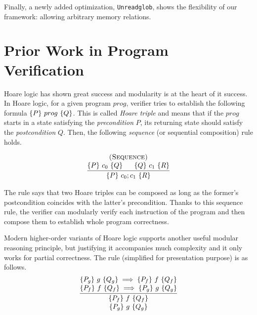 Finally, a newly added optimization, \texttt{Unreadglob}, shows the flexibility of our framework:
allowing arbitrary memory relations.





\section{Prior Work in Program Verification}\label{sec:overview:program}


Hoare logic has shown great success and modularity is at the heart of it success.
In Hoare logic, for a given program $prog$, verifier tries to establish the following formula $\{{P}\}~{prog}~\{{Q}\}$.
This is called {\it Hoare triple} and means that if the $prog$ starts in a state satisfying the {\it precondition} $P$,
its returning state should satisfy the {\it postcondition} $Q$. Then, the following {\it sequence} (or sequential composition) rule holds.

\[
\infer
    {\hoare{P}{c_{0} ; c_{1}}{R}}
    {\deduce{\hoare{P}{c_{0}}{Q} \;\;\;\;\;\; \hoare{Q}{c_{1}}{R}}
      {\textsc{(Sequence)}}}
\]

\noindent The rule says that two Hoare triples can be composed as long as the former's postcondition coincides with the latter's precondition. Thanks to this sequence rule, the verifier can modularly verify each instruction of the program and then compose them to establish whole program correctness.



Modern higher-order variants of Hoare logic\cite{VST,appel:plcc} supports another useful modular reasoning principle, but justifying it accompanies much complexity and it only works for partial correctness.
The rule (simplified for presentation purpose) is as follows.
\[
\infer
    {\deduce{\hoare{P_{g}}{g}{Q_{g}}}{\hoare{P_{f}}{f}{Q_{f}}}}
    {\deduce{\hoare{P_{f}}{f}{Q_{f}} \implies \hoare{P_{g}}{g}{Q_{g}}}
            {\hoare{P_{g}}{g}{Q_{g}} \implies \hoare{P_{f}}{f}{Q_{f}}}
    }
\]

